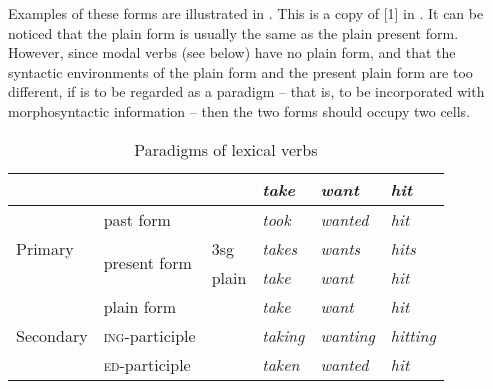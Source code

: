 \documentclass[UTF8, a4paper, oneside, scheme=plain]{ctexrep}
\newcommand*{\citesec}[1]{\S~{#1}}
\newcommand{\corpus}[1]{\emph{#1}}
\newcommand{\corpuscat}[1]{\textsc{#1}}
\begin{document}
Examples of these forms are illustrated in . 
This is a copy of [1] in \citet[\citesec{1.1}]{cgel}.
It can be noticed that the plain form is usually the same as the plain present form.
However, since modal verbs (see below) have no plain form,
and that the syntactic environments of the plain form and the present plain form are too different,
if  is to be regarded as a paradigm
-- that is, to be incorporated with morphosyntactic information -- 
then the two forms should occupy two cells.

\begin{table}[H]
    \caption{Paradigms of lexical verbs}
    \label{tbl:lexical-inflection}
    \centering
    \begin{tabular}{@{}llllll@{}}
    \toprule
    \multicolumn{1}{l}{}       &                               &       & \corpus{take}   & \corpus{want}    & \corpus{hit}     \\ \midrule
    \multirow{3}{*}{Primary}   & past form                     &       & \corpus{took}   & \corpus{wanted}  & \corpus{hit}     \\
                               & \multirow{2}{*}{present form} & 3sg   & \corpus{takes}  & \corpus{wants}   & \corpus{hits}    \\
                               &                               & plain & \corpus{take}   & \corpus{want}    & \corpus{hit}     \\ \midrule
    \multirow{3}{*}{Secondary} & plain form                    &       & \corpus{take}   & \corpus{want}    & \corpus{hit}     \\
                               & \corpuscat{ing}-participle       &       & \corpus{taking} & \corpus{wanting} & \corpus{hitting} \\
                               & \corpuscat{ed}-participle        &       & \corpus{taken}  & \corpus{wanted}  & \corpus{hit}     \\ \bottomrule
    \end{tabular}
\end{table}
\end{document}
